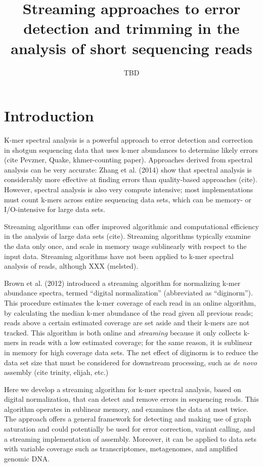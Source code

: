 



\title{Streaming approaches to error detection and trimming in the analysis of
short sequencing reads}
\author{TBD}
\maketitle

\section{Introduction}

K-mer spectral analysis is a powerful approach to error detection and
correction in shotgun sequencing data that uses k-mer abundances to
determine likely errors (cite Pevzner, Quake, khmer-counting paper).
Approaches derived from spectral analysis can be very accurate: Zhang
et al. (2014) show that spectral analysis is considerably more
effective at finding errors than quality-based approaches (cite).  However,
spectral analysis is also very compute intensive; most implementations
must count k-mers across entire sequencing data sets, which can be
memory- or I/O-intensive for large data sets.

Streaming algorithms can offer improved algorithmic and computational
efficiency in the analysis of large data sets (cite).  Streaming
algorithms typically examine the data only once, and scale in memory
usage sublinearly with respect to the input data.  Streaming
algorithms have not been applied to k-mer spectral analysis of reads,
although XXX (melsted).

Brown et al. (2012) introduced a streaming algorithm for normalizing
k-mer abundance spectra, termed ``digital normalization'' (abbreviated
as ``diginorm'').  This procedure estimates the k-mer coverage of each
read in an online algorithm, by calculating the median k-mer abundance
of the read given all previous reads; reads above a certain estimated
coverage are set aside and their k-mers are not tracked.  This
algorithm is both online and {\em streaming} because it only collects
k-mers in reads with a low estimated coverage; for the same reason, it
is sublinear in memory for high coverage data sets.  The net effect of
diginorm is to reduce the data set size that must be considered for
downstream processing, such as {\em de novo} assembly (cite trinity,
elijah, etc.)

Here we develop a streaming algorithm for k-mer spectral analysis,
based on digital normalization, that can detect and remove errors in
sequencing reads.  This algorithm operates in sublinear memory, and
examines the data at most twice.  The approach offers a general
framework for detecting and making use of graph saturation and could
potentially be used for error correction, variant calling, and
a streaming implementation of assembly.  Moreover, it can be applied to
data sets with variable coverage such as transcriptomes, metagenomes, and
amplified genomic DNA.

